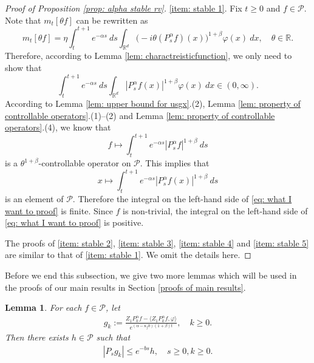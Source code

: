 \documentclass[12pt,a4paper]{amsart}
\theoremstyle{plain}
\newtheorem{lem}[thm]{Lemma}
\theoremstyle{definition}
\numberwithin{equation}{section}
\begin{document}
\begin{proof}[Proof of Proposition \ref{prop: alpha stable rv}]
    \eqref{item: stable 1}.
	Fix $t\geq 0$ and $f\in \mathcal P$.
	Note that $m_t[\theta f]$ can be rewritten as
\[
    m_t[\theta f]
       = \eta \int_t^{t+1}e^{-\alpha s}~ds\int_{\mathbb R^d} \big(-i\theta (P_{s}^\alpha f)(x)\big)^{1+\beta} \varphi(x)~dx,
    \quad \theta \in \mathbb R.
\]
	Therefore, according to Lemma \ref{lem: charactreisticfunction}, we only need to show that
\begin{equation}
\label{eq: what I want to proof}
	 \int_t^{t+1}e^{-\alpha s}~ds\int_{\mathbb R^d} | P_{s}^\alpha f(x)|^{1+\beta} \varphi(x)~dx
	\in (0, \infty).
\end{equation}
	According to Lemma \ref{lem: upper bound for usgx}.(2), Lemma \ref{lem: property of controllable operators}.(1)--(2) and Lemma \ref{lem: property of controllable operators}.(4),
      we know that
      \[
      f \mapsto \int_t^{t+1}e^{-\alpha s} |P_{s}^\alpha f|^{1+\beta}~ds
      \]
 is a $\theta^{1+\beta}$-controllable operator on $\mathcal P$.
	    This implies that \[ x \mapsto \int_t^{t+1}e^{-\alpha s} |P_{s}^\alpha f(x)|^{1+\beta}~ds\] is an element of $\mathcal P$.
	Therefore the integral on the left-hand side of \eqref{eq: what I want to proof} is finite.
	Since $f$ is non-trivial,
    the integral on the left-hand side of \eqref{eq: what I want to proof} is positive.

The proofs of \eqref{item: stable 2}, \eqref{item: stable 3}, \eqref{item: stable 4} and \eqref{item: stable 5} are similar to that of \eqref{item: stable 1}. We omit the details here.
\end{proof}

 Before we end this subsection, we  give  two more lemmas which will be used in the proofs of our main results in Section \ref{proofs of main results}.

\begin{lem}{\cite[Lemma 2.8]{MarksMilos2018CLT}}\label{lem: control of gk}
    For each $f\in \mathcal{P}$, let
\begin{align}
    g_k
    := \frac{Z_1 P^{\alpha}_k f-\langle  Z_1P^{\alpha}_k f,\varphi\rangle}{e^{(\alpha-\kappa_f b)(1+\beta)t}},
    \quad k \geq 0.
\end{align}
    Then there exists $h\in \mathcal{P}$ such that
\begin{align}
    |P_sg_k|\leq e^{-bs}h,\quad s\geq 0, k \geq 0.
\end{align}
\end{lem}
\end{document}
